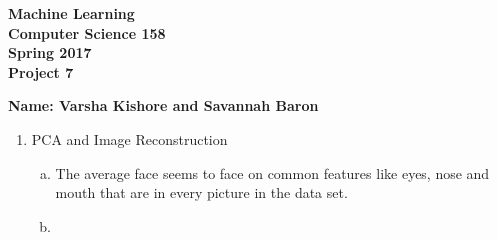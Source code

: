 \documentclass[11pt]{article}
\begin{document}
\newcommand{\Name}[1]{\noindent \textbf{Name:} #1 \\}
\newcommand{\pderiv}[2]{\frac{\partial #1}{\partial #2}}
\newcommand{\psderiv}[3]{\frac{\partial^2 #1}{\partial #2 \partial #3}}

\begin{center}
	\bf
	Machine Learning \\
	Computer Science 158 \\
	Spring 2017 \\
	\rm
	Project 7\\
\end{center}
\noindent \textbf{Name: Varsha Kishore and Savannah Baron} \\

\begin{enumerate}[1]
\item PCA and Image Reconstruction
\begin{enumerate}[(a)]
\item The average face seems to face on common features like eyes, nose and mouth that are in every picture in the data set. 
\item 
\end{enumerate}
\end{enumerate}
\end{document}
